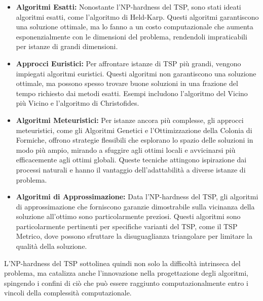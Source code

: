 \begin{itemize}
	\item \textbf{Algoritmi Esatti:} Nonostante l'\gls{NP}-hardness del \gls{TSP}, sono stati ideati algoritmi esatti, come l'algoritmo di Held-Karp. Questi algoritmi garantiscono una soluzione ottimale, ma lo fanno a un costo computazionale che aumenta esponenzialmente con le dimensioni del problema, rendendoli impraticabili per istanze di grandi dimensioni.
	\item \textbf{Approcci Euristici:} Per affrontare istanze di \gls{TSP} più grandi, vengono impiegati algoritmi euristici. Questi algoritmi non garantiscono una soluzione ottimale, ma possono spesso trovare buone soluzioni in una frazione del tempo richiesto dai metodi esatti. Esempi includono l'algoritmo del Vicino più Vicino e l'algoritmo di Christofides.
	\item \textbf{Algoritmi Meteuristici:} Per istanze ancora più complesse, gli approcci meteuristici, come gli Algoritmi Genetici e l'Ottimizzazione della Colonia di Formiche, offrono strategie flessibili che esplorano lo spazio delle soluzioni in modo più ampio, mirando a sfuggire agli ottimi locali e avvicinarsi più efficacemente agli ottimi globali. Queste tecniche attingono ispirazione dai processi naturali e hanno il vantaggio dell'adattabilità a diverse istanze di problema.
	\item \textbf{Algoritmi di Approssimazione:} Data l'\gls{NP}-hardness del \gls{TSP}, gli algoritmi di approssimazione che forniscono garanzie dimostrabile sulla vicinanza della soluzione all'ottimo sono particolarmente preziosi. Questi algoritmi sono particolarmente pertinenti per specifiche varianti del \gls{TSP}, come il \gls{TSP} Metrico, dove possono sfruttare la disuguaglianza triangolare per limitare la qualità della soluzione.
\end{itemize}

L'\gls{NP}-hardness del \gls{TSP} sottolinea quindi non solo la difficoltà intrinseca del problema, ma catalizza anche l'innovazione nella progettazione degli algoritmi, spingendo i confini di ciò che può essere raggiunto computazionalmente entro i vincoli della complessità computazionale.
